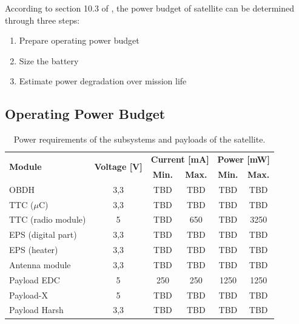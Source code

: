 According to section 10.3 of \cite{larson2005}, the power budget of satellite can be determined through three steps:

\begin{enumerate}
    \item Prepare operating power budget
    \item Size the battery
    \item Estimate power degradation over mission life
\end{enumerate}

\subsection{Operating Power Budget}

\begin{table}[!h]
    \centering
    \begin{tabular}{lccccc}
        \toprule[1.5pt]
        \multirow{2}{*}{\textbf{Module}} & \multirow{2}{*}{\textbf{Voltage [V]}}    & \multicolumn{2}{c}{\textbf{Current [mA]}} & \multicolumn{2}{c}{\textbf{Power [mW]}} \\
                                         &                                          & \textbf{Min.} & \textbf{Max.}             & \textbf{Min.} & \textbf{Max.} \\
        \midrule
        OBDH                & 3,3   & TBD   & TBD   & TBD   & TBD \\
        TTC ($\mu$C)        & 3,3   & TBD   & TBD   & TBD   & TBD \\
        TTC (radio module)  & 5     & TBD   & 650   & TBD   & 3250 \\
        EPS (digital part)  & 3,3   & TBD   & TBD   & TBD   & TBD \\
        EPS (heater)        & 3,3   & TBD   & TBD   & TBD   & TBD \\
        Antenna module      & 3,3   & TBD   & TBD   & TBD   & TBD \\
        Payload EDC         & 5     & 250   & 250   & 1250  & 1250 \\
        Payload-X           & 5     & TBD   & TBD   & TBD   & TBD \\
        Payload Harsh       & 3,3   & TBD   & TBD   & TBD   & TBD \\
        \bottomrule[1.5pt]
    \end{tabular}
    \caption{Power requirements of the subsystems and payloads of the satellite.}
    \label{tab:power-requirements}
\end{table}

